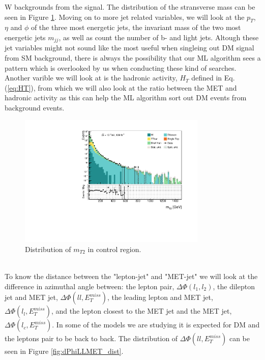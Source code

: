 \documentclass[14pt, a4paper]{book}
\begin{document}
W backgrounds from the signal. The distribution of the stransverse mass can be seen in Figure \ref{fig:mt2_dist}. Moving on to more jet related variables, we will look at the $p_T$, $\eta$ and $\phi$ of the three most energetic jets, the invariant mass of the two most energetic jets $m_{jj}$, as well as count the number of b- and light jets. Altough these jet 
variables might not sound like the most useful when singleing out DM signal from SM background, there is always the possibility that our ML algorithm sees a pattern which is overlooked by us when conducting these kind of searches. 
Another varible we will look at is the hadronic activity, $H_T$ defined in Eq. (\ref{eq:HT}), from which we will also look at the ratio between the MET and hadronic activity as this can help the ML algorithm sort out DM events from background events.\\
\begin{figure}[!ht]
    \centering
        \includegraphics[width=0.8\textwidth]{mt2.pdf}
    \caption{Distribution of $m_{T2}$ in control region.}\label{fig:mt2_dist}
\end{figure}
\\To know the distance between the "lepton-jet" and "MET-jet" we will look at the difference in azimuthal angle between: the lepton pair, $\Delta\Phi(l_1,l_2)$, the dilepton jet and MET jet, $\Delta\Phi(ll,E_T^{miss})$, the leading lepton and MET jet, $\Delta\Phi(l_l,E_T^{miss})$, 
and the lepton closest to the MET jet and the MET jet, $\Delta\Phi(l_c,E_T^{miss})$. In some of the models we are studying it is expected for DM and the leptons pair to be back to back. The distribution of $\Delta\Phi(ll,E_T^{miss})$ can be seen in Figure \ref{fig:dPhiLLMET_dist}.
\end{document}
